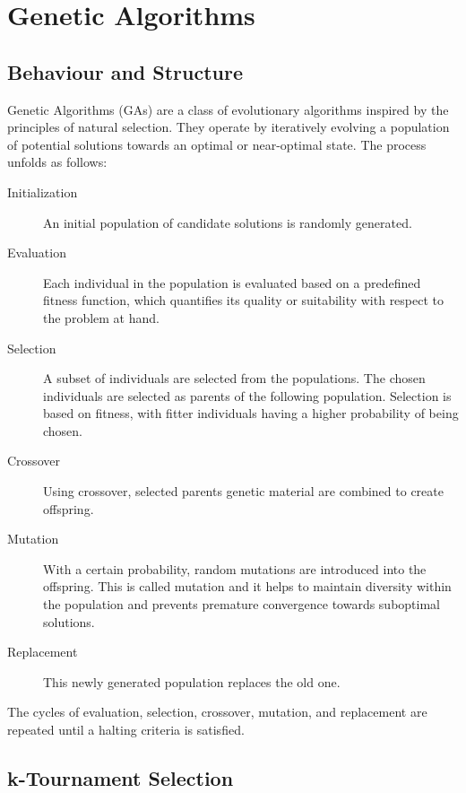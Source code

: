 \chapter{Genetic Algorithms}

\section{Behaviour and Structure}

Genetic Algorithms (GAs) are a class of evolutionary algorithms inspired by the principles of natural selection. They operate by iteratively evolving a population of potential solutions towards an optimal or near-optimal state. The process unfolds as follows:

\begin{description}

	\item[Initialization] An initial population of candidate solutions is randomly generated.

	\item[Evaluation] Each individual in the population is evaluated based on a predefined fitness function, which quantifies its quality or suitability with respect to the problem at hand.

	\item[Selection] A subset of individuals are selected from the populations. The chosen individuals are selected as parents of the following population. Selection is based on fitness, with fitter individuals having a higher probability of being chosen.

	\item[Crossover] Using crossover, selected parents genetic material are combined to create offspring.
	
	\item[Mutation] With a certain probability, random mutations are introduced into the offspring. This is called mutation and it helps to maintain diversity within the population and prevents premature convergence towards suboptimal solutions.
	
	\item[Replacement] This newly generated population replaces the old one.
	
\end{description}

The cycles of evaluation, selection, crossover, mutation, and replacement are repeated until a halting criteria is satisfied.

\section{k-Tournament Selection}


